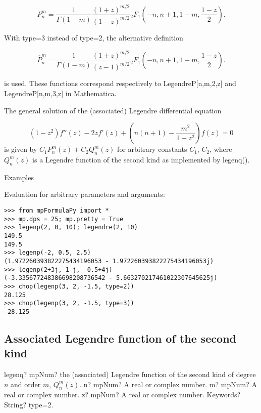 \begin{equation}
P_n^m = \frac{1}{\Gamma(1-m)}\frac{(1+z)^{m/2}}{(1-z)^{m/2}} {}_2F_1\left(-n, n+1, 1-m, \frac{1-z}{2} \right).
\end{equation}

With type=3 instead of type=2, the alternative definition

\begin{equation}
\widehat{P}_n^m = \frac{1}{\Gamma(1-m)}\frac{(1+z)^{m/2}}{(z-1)^{m/2}} {}_2F_1\left(-n, n+1, 1-m, \frac{1-z}{2} \right).
\end{equation}


is used. These functions correspond respectively to LegendreP[n,m,2,z] and
LegendreP[n,m,3,z] in Mathematica.

\vpara
The general solution of the (associated) Legendre differential equation

\begin{equation}
(1-z^2)f''(z) - 2zf'(z) + \left(n(n+1)-\frac{m^2}{1-z^2} \right)f(z)=0
\end{equation}
is given by $C_1 P_n^m(z) + C_2 Q_n^m(z)$ for arbitrary constants $C_1$, $C_2$, where $Q_n^m(z)$ is a Legendre function of the second kind as implemented by legenq().

\vpara
Examples

Evaluation for arbitrary parameters and arguments:

\begin{lstlisting}
>>> from mpFormulaPy import *
>>> mp.dps = 25; mp.pretty = True
>>> legenp(2, 0, 10); legendre(2, 10)
149.5
149.5
>>> legenp(-2, 0.5, 2.5)
(1.972260393822275434196053 - 1.972260393822275434196053j)
>>> legenp(2+3j, 1-j, -0.5+4j)
(-3.335677248386698208736542 - 5.663270217461022307645625j)
>>> chop(legenp(3, 2, -1.5, type=2))
28.125
>>> chop(legenp(3, 2, -1.5, type=3))
-28.125
\end{lstlisting}









\subsection{Associated Legendre function of the second kind}

\begin{mpFunctionsExtract}
	\mpFunctionFour
	{legenq? mpNum? the (associated) Legendre function of the second kind of degree $n$ and order $m$, $Q_n^m(z)$.}
	{n? mpNum? A real or complex number.}
	{m? mpNum? A real or complex number.}	
	{z? mpNum? A real or complex number.}		
	{Keywords? String? type=2.}	
\end{mpFunctionsExtract}

